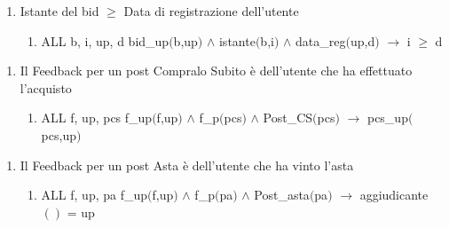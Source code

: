 \documentclass{article}
\begin{document}
\begin{enumerate}
    \item Istante del bid $\geq$ Data di registrazione dell'utente
    \begin{enumerate}
        \item ALL b, i, up, d bid\_up$($b,up$)$ $\land$ istante$($b,i$)$ $\land$ data\_reg$($up,d$)$ $\rightarrow$ i $\geq$ d
    \end{enumerate}
\end{enumerate}

\begin{enumerate}
    \item Il Feedback per un post Compralo Subito è dell'utente che ha effettuato l'acquisto
    \begin{enumerate}
        \item ALL f, up, pcs f\_up$($f,up$)$ $\land$ f\_p$($pcs$)$ $\land$ Post\_CS$($pcs$)$ $\rightarrow$ pcs\_up$($pcs,up$)$
    \end{enumerate}
\end{enumerate}

\begin{enumerate}
    \item Il Feedback per un post Asta è dell'utente che ha vinto l'asta
    \begin{enumerate}
        \item ALL f, up, pa f\_up$($f,up$)$ $\land$ f\_p$($pa$)$ $\land$ Post\_asta$($pa$)$ $\rightarrow$ aggiudicante$()$ = up
    \end{enumerate}
\end{enumerate}
\end{document}
